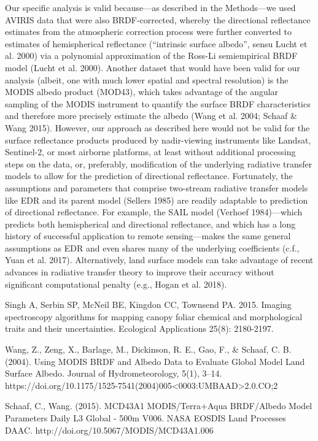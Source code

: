 Our specific analysis is valid because---as described in the Methods---we used AVIRIS data that were also BRDF-corrected, whereby the directional reflectance estimates from the atmospheric correction process were further converted to estimates of hemispherical reflectance (“intrinsic surface albedo”, sensu Lucht et al. 2000) via a polynomial approximation of the Ross-Li semiempirical BRDF model (Lucht et al. 2000). Another dataset that would have been valid for our analysis (albeit, one with much lower spatial and spectral resolution) is the MODIS albedo product (MOD43), which takes advantage of the angular sampling of the MODIS instrument to quantify the surface BRDF characteristics and therefore more precisely estimate the albedo (Wang et al. 2004; Schaaf \& Wang 2015). However, our approach as described here would not be valid for the surface reflectance products produced by nadir-viewing instruments like Landsat, Sentinel-2, or most airborne platforms, at least without additional processing steps on the data, or, preferably, modification of the underlying radiative transfer models to allow for the prediction of directional reflectance. Fortunately, the assumptions and parameters that comprise two-stream radiative transfer models like EDR and its parent model (Sellers 1985) are readily adaptable to prediction of directional reflectance. For example, the SAIL model (Verhoef 1984)---which predicts both hemispherical and directional reflectance, and which has a long history of successful application to remote sensing---makes the same general assumptions as EDR and even shares many of the underlying coefficients (c.f., Yuan et al. 2017). Alternatively, land surface models can take advantage of recent advances in radiative transfer theory to improve their accuracy without significant computational penalty (e.g., Hogan et al. 2018).

\medskip
\noindent Singh A, Serbin SP, McNeil BE, Kingdon CC, Townsend PA. 2015. Imaging spectroscopy algorithms for mapping canopy foliar chemical and morphological traits and their uncertainties. Ecological Applications 25(8): 2180-2197.

\medskip
\noindent Wang, Z., Zeng, X., Barlage, M., Dickinson, R. E., Gao, F., \& Schaaf, C. B. (2004). Using MODIS BRDF and Albedo Data to Evaluate Global Model Land Surface Albedo. Journal of Hydrometeorology, 5(1), 3–14. https://doi.org/10.1175/1525-7541(2004)005<0003:UMBAAD>2.0.CO;2

\medskip
\noindent Schaaf, C., Wang. (2015). MCD43A1 MODIS/Terra+Aqua BRDF/Albedo Model Parameters Daily L3 Global - 500m V006. NASA EOSDIS Land Processes DAAC.
http://doi.org/10.5067/MODIS/MCD43A1.006

